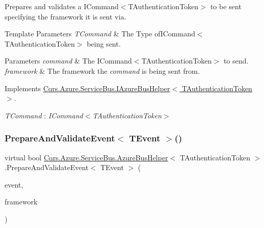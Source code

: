 Prepares and validates a I\+Command$<$\+T\+Authentication\+Token$>$ to be sent specifying the framework it is sent via. 


\begin{DoxyTemplParams}{Template Parameters}
{\em T\+Command} & The Type ofI\+Command$<$\+T\+Authentication\+Token$>$ being sent.\\
\hline
\end{DoxyTemplParams}

\begin{DoxyParams}{Parameters}
{\em command} & The I\+Command$<$\+T\+Authentication\+Token$>$ to send.\\
\hline
{\em framework} & The framework the {\itshape command}  is being sent from.\\
\hline
\end{DoxyParams}


Implements \hyperlink{interfaceCqrs_1_1Azure_1_1ServiceBus_1_1IAzureBusHelper_a283ee2cf9241a5364dd5569a9f12fa10_a283ee2cf9241a5364dd5569a9f12fa10}{Cqrs.\+Azure.\+Service\+Bus.\+I\+Azure\+Bus\+Helper$<$ T\+Authentication\+Token $>$}.

\begin{Desc}
\item[Type Constraints]\begin{description}
\item[{\em T\+Command} : {\em I\+Command$<$T\+Authentication\+Token$>$}]\end{description}
\end{Desc}
\mbox{\label{classCqrs_1_1Azure_1_1ServiceBus_1_1AzureBusHelper_ab0f6ff2ee04ad3b58e6713caebd3b560_ab0f6ff2ee04ad3b58e6713caebd3b560}} 
\subsubsection{\texorpdfstring{Prepare\+And\+Validate\+Event$<$ T\+Event $>$()}{PrepareAndValidateEvent< TEvent >()}}
{\footnotesize\ttfamily virtual bool \hyperlink{classCqrs_1_1Azure_1_1ServiceBus_1_1AzureBusHelper}{Cqrs.\+Azure.\+Service\+Bus.\+Azure\+Bus\+Helper}$<$ T\+Authentication\+Token $>$.Prepare\+And\+Validate\+Event$<$ T\+Event $>$ (\begin{DoxyParamCaption}\item[{T\+Event @}]{event,  }\item[{string}]{framework }\end{DoxyParamCaption})\hspace{0.3cm}{\ttfamily [virtual]}}



